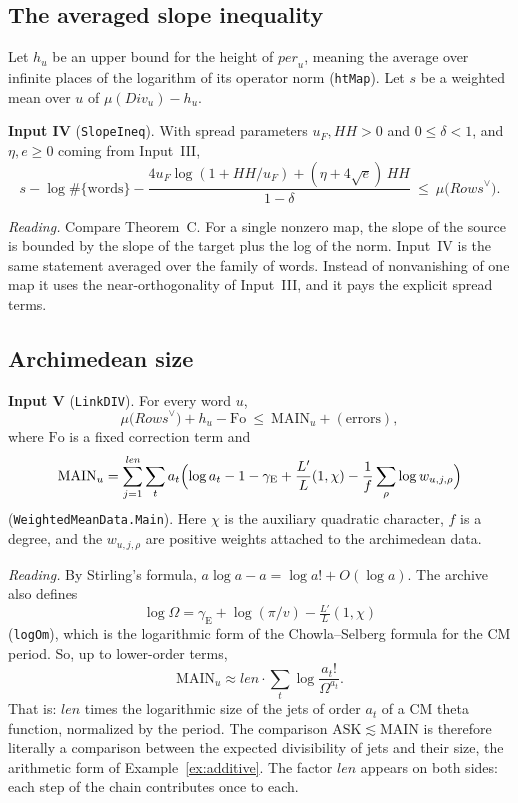 \documentclass[11pt]{amsart}
\theoremstyle{definition}
\theoremstyle{remark}
\newcommand{\per}{\mathit{per}}
\newcommand{\len}{\mathit{len}}
\newcommand{\dual}{^{\vee}}
\newcommand{\ASK}{\mathrm{ASK}}
\newcommand{\MAIN}{\mathrm{MAIN}}
\begin{document}
\subsection{The averaged slope inequality}
Let $h_u$ be an upper bound for the height of $\per_u$, meaning the average over infinite places of the logarithm of its operator norm (\texttt{htMap}). Let $s$ be a weighted mean over $u$ of $\mu(\mathit{Div}_u)-h_u$.

\noindent\textbf{Input IV} (\texttt{SlopeIneq}). With spread parameters $u_F,\mathit{HH}>0$ and $0\le\delta<1$, and $\eta,e\ge0$ coming from Input~III,
\[
s-\log\#\{\text{words}\}-\frac{4u_F\log(1+\mathit{HH}/u_F)+(\eta+4\sqrt e)\,\mathit{HH}}{1-\delta}\ \le\ \mu\bigl(\mathit{Rows}\dual\bigr).
\]

\noindent\emph{Reading.} Compare Theorem~C. For a single nonzero map, the slope of the source is bounded by the slope of the target plus the log of the norm. Input~IV is the same statement averaged over the family of words. Instead of nonvanishing of one map it uses the near-orthogonality of Input~III, and it pays the explicit spread terms.

\subsection{Archimedean size}
\noindent\textbf{Input V} (\texttt{LinkDIV}). For every word $u$,
\[
\mu\bigl(\mathit{Rows}\dual\bigr)+h_u-\mathrm{Fo}\ \le\ \MAIN_u+(\text{errors}),
\]
where $\mathrm{Fo}$ is a fixed correction term and
\begin{equation}\label{eq:main-archive}
\MAIN_u=\sum_{j=1}^{\len}\sum_t a_t\Bigl(\log a_t-1-\gamma_{\mathrm E}+\frac{L'}{L}(1,\chi)-\frac1f\sum_{\rho}\log w_{u,j,\rho}\Bigr)
\end{equation}
(\texttt{WeightedMeanData.Main}). Here $\chi$ is the auxiliary quadratic character, $f$ is a degree, and the $w_{u,j,\rho}$ are positive weights attached to the archimedean data.

\noindent\emph{Reading.} By Stirling's formula, $a\log a-a=\log a!+O(\log a)$. The archive also defines
\[
\log\Omega=\gamma_{\mathrm E}+\log(\pi/v)-\tfrac{L'}{L}(1,\chi)
\]
(\texttt{logOm}), which is the logarithmic form of the Chowla--Selberg formula for the CM period. So, up to lower-order terms,
\[
\MAIN_u\approx\len\cdot\sum_t\log\frac{a_t!}{\Omega^{a_t}} .
\]
That is: $\len$ times the logarithmic size of the jets of order $a_t$ of a CM theta function, normalized by the period. The comparison $\ASK\lesssim\MAIN$ is therefore literally a comparison between the expected divisibility of jets and their size, the arithmetic form of Example~\ref{ex:additive}. The factor $\len$ appears on both sides: each step of the chain contributes once to each.
\end{document}
